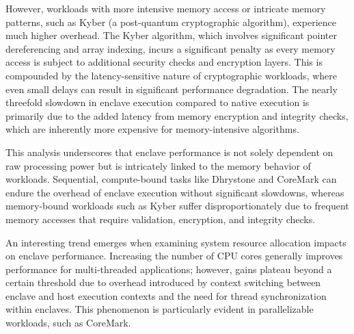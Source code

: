 However, workloads with more intensive memory access or intricate memory patterns, such as Kyber (a post-quantum cryptographic algorithm), experience much higher overhead. The Kyber algorithm, which involves significant pointer dereferencing and array indexing, incurs a significant penalty as every memory access is subject to additional security checks and encryption layers. This is compounded by the latency-sensitive nature of cryptographic workloads, where even small delays can result in significant performance degradation. The nearly threefold slowdown in enclave execution compared to native execution is primarily due to the added latency from memory encryption and integrity checks, which are inherently more expensive for memory-intensive algorithms.

This analysis underscores that enclave performance is not solely dependent on raw processing power but is intricately linked to the memory behavior of workloads. Sequential, compute-bound tasks like Dhrystone and CoreMark can endure the overhead of enclave execution without significant slowdowns, whereas memory-bound workloads such as Kyber suffer disproportionately due to frequent memory accesses that require validation, encryption, and integrity checks.

An interesting trend emerges when examining system resource allocation impacts on enclave performance. Increasing the number of CPU cores generally improves performance for multi-threaded applications; however, gains plateau beyond a certain threshold due to overhead introduced by context switching between enclave and host execution contexts and the need for thread synchronization within enclaves. This phenomenon is particularly evident in parallelizable workloads, such as CoreMark.

